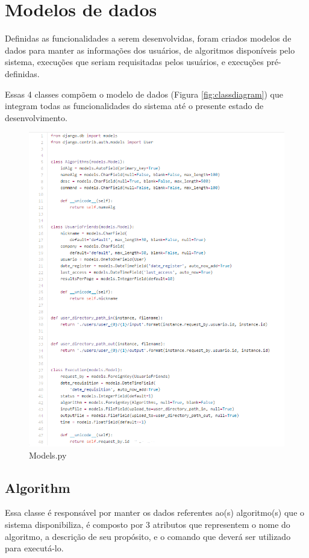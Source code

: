 \documentclass[tg]{mdtufsm}
\begin{document}
\section{Modelos de dados}
Definidas as funcionalidades a serem desenvolvidas, foram criados modelos de dados para manter as informações dos usuários, de algoritmos disponíveis pelo sistema, execuções que seriam requisitadas pelos usuários, e execuções pré-definidas.

Essas 4 classes compõem o modelo de dados (Figura \ref{fig:classdiagram}) que integram todas as funcionalidades do sistema até o presente estado de desenvolvimento.

\begin{figure}
	\centering
	\includegraphics[width=1\textwidth]{models}
	\caption{
		Models.py
	}
	\label{fig:modelo}
\end{figure}

\subsection{Algorithm}
Essa classe é responsável por manter os dados referentes ao(s) algoritmo(s) que o sistema disponibiliza, é composto por 3 atributos que representem o nome do algoritmo, a descrição de seu propósito, e o comando que deverá ser utilizado para executá-lo.
\end{document}
